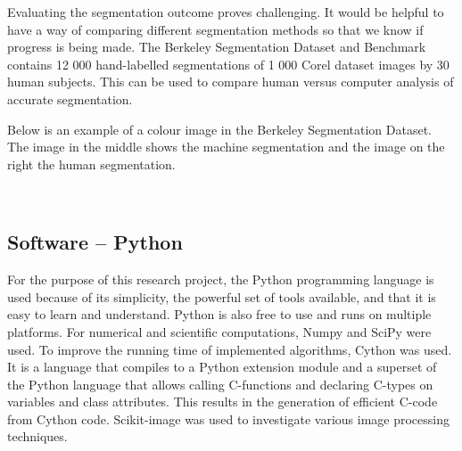 \documentclass[a4paper,10pt]{article}
\begin{document}
Evaluating the segmentation outcome proves challenging.  It would be helpful to have a way of comparing
different
segmentation methods so that we know if progress is being made. 
The Berkeley Segmentation Dataset and Benchmark \cite{dataset} contains 12 000 hand-labelled
segmentations of 1 000 Corel dataset images by 30 human subjects. 
This can be used to compare human versus computer analysis of accurate segmentation. 

Below is an example of a colour image in the Berkeley Segmentation Dataset.  The image in the middle shows the machine segmentation and the
image on the right the human segmentation.

\begin{figure}[H]
\centering
\mbox{ \quad
{} \quad
{}}
\end{figure}

\subsection{Software -- Python}
For the purpose of this research project, the Python programming language is
used because of its simplicity, the powerful set of tools
available, and that it is easy to learn and understand.  Python is
also free to use and runs on multiple platforms.  For numerical and
scientific computations, Numpy and SciPy were used.
To improve the running time of implemented algorithms, Cython was used.  It is a
language that compiles to a Python extension module and a superset of the
Python language that allows calling C-functions and declaring C-types on
variables and class attributes.  This
results in the generation of efficient C-code from Cython code.
Scikit-image was used to investigate various image processing
techniques. \\
\end{document}
